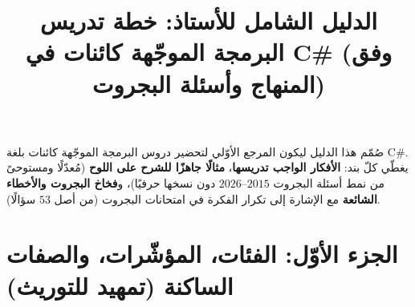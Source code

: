\documentclass[14pt]{extarticle}
\title{الدليل الشامل للأستاذ: خطة تدريس البرمجة الموجّهة كائنات في \textenglish{C\#} (وفق المنهاج وأسئلة البجروت)}
\begin{document}
\maketitle
\thispagestyle{fancy}

\begin{boxDef}
صُمّم هذا الدليل ليكون المرجع الأوّلي لتحضير دروس البرمجة الموجّهة كائنات بلغة \textenglish{C\#}. يغطّي كلّ بند: \textbf{الأفكار الواجب تدريسها}، \textbf{مثالًا جاهزًا للشرح على اللوح} (مُعدّلًا ومستوحىً من نمط أسئلة البجروت $2015$--$2026$ دون نسخها حرفيًا)، و\textbf{فخاخ البجروت والأخطاء الشائعة} مع الإشارة إلى تكرار الفكرة في امتحانات البجروت (من أصل $53$ سؤالًا).
\end{boxDef}

\section*{الجزء الأوّل: الفئات، المؤشّرات، والصفات الساكنة (تمهيد للتوريث)}
\end{document}
